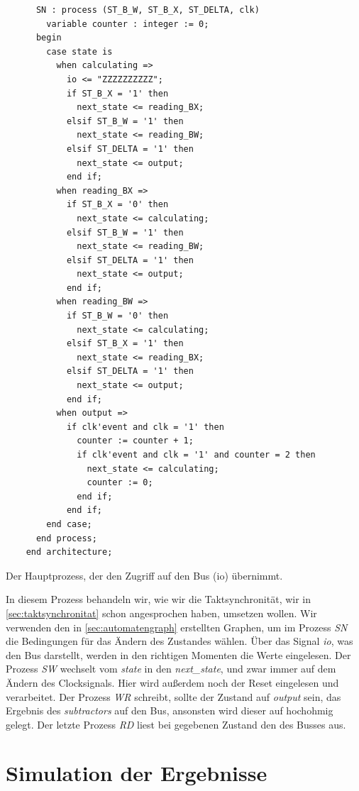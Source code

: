 \documentclass{report}
\newenvironment{longlisting}{\captionsetup{type=listing}}{}
\begin{document}
\begin{longlisting}
\begin{verbatim}
      SN : process (ST_B_W, ST_B_X, ST_DELTA, clk)
        variable counter : integer := 0;
      begin
        case state is
          when calculating =>
            io <= "ZZZZZZZZZZ";
            if ST_B_X = '1' then
              next_state <= reading_BX;
            elsif ST_B_W = '1' then
              next_state <= reading_BW;
            elsif ST_DELTA = '1' then
              next_state <= output;
            end if;
          when reading_BX =>
            if ST_B_X = '0' then
              next_state <= calculating;
            elsif ST_B_W = '1' then
              next_state <= reading_BW;
            elsif ST_DELTA = '1' then
              next_state <= output;
            end if;
          when reading_BW =>
            if ST_B_W = '0' then
              next_state <= calculating;
            elsif ST_B_X = '1' then
              next_state <= reading_BX;
            elsif ST_DELTA = '1' then
              next_state <= output;
            end if;
          when output =>
            if clk'event and clk = '1' then
              counter := counter + 1;
              if clk'event and clk = '1' and counter = 2 then
                next_state <= calculating;
                counter := 0;
              end if;
            end if;
        end case;
      end process;
    end architecture;
  \end{verbatim}
  \caption{Der Hauptprozess, der den Zugriff auf den Bus (io) übernimmt.}
  \label{code:comp}
\end{longlisting}

In diesem Prozess behandeln wir, wie wir die Taktsynchronität, wir in \ref{sec:taktsynchronitat} schon angesprochen haben, umsetzen wollen. Wir verwenden den in \ref{sec:automatengraph} erstellten Graphen, um im Prozess \textit{SN} die Bedingungen für das Ändern des Zustandes wählen. Über das Signal \textit{io}, was den Bus darstellt, werden in den richtigen Momenten die Werte eingelesen. Der Prozess \textit{SW} wechselt vom \textit{state} in den \textit{next\_state}, und zwar immer auf dem Ändern des Clocksignals. Hier wird außerdem noch der Reset eingelesen und verarbeitet. Der Prozess \textit{WR} schreibt, sollte der Zustand auf \textit{output} sein, das Ergebnis des \textit{subtractors} auf den Bus, ansonsten wird dieser auf hochohmig gelegt. Der letzte Prozess \textit{RD} liest bei gegebenen Zustand den des Busses aus. 

\section{Simulation der Ergebnisse}
\label{sec:simul-der-ergebn-1}
\end{document}
